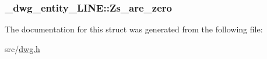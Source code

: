 \hypertarget{struct__dwg__entity__LINE_aba3dbe01803d30f0ddb0ef0972c7e47e}{
\subsubsection[{\-Zs\-\_\-are\-\_\-zero}]{ {\bf \-\_\-dwg\-\_\-entity\-\_\-\-L\-I\-N\-E\-::\-Zs\-\_\-are\-\_\-zero}}}\label{struct__dwg__entity__LINE_aba3dbe01803d30f0ddb0ef0972c7e47e}


\-The documentation for this struct was generated from the following file\-:\begin{DoxyCompactItemize}
\item 
src/\hyperlink{dwg_8h}{dwg.\-h}\end{DoxyCompactItemize}
